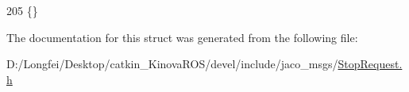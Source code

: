 \begin{DoxyCode}
205   \{\}
\end{DoxyCode}


The documentation for this struct was generated from the following file\+:\begin{DoxyCompactItemize}
\item 
D\+:/\+Longfei/\+Desktop/catkin\+\_\+\+Kinova\+R\+O\+S/devel/include/jaco\+\_\+msgs/\hyperlink{StopRequest_8h}{Stop\+Request.\+h}\end{DoxyCompactItemize}
